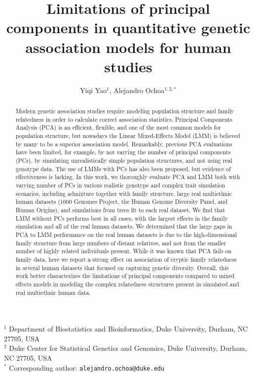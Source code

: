 \documentclass[11pt]{article}
\title{\Large \textbf{
    Limitations of principal components in quantitative genetic association models for human studies
  }}
\author{Yiqi Yao$^1$, Alejandro Ochoa$^{1,2,*}$}
\date{}
\begin{document}
\maketitle

\noindent
$^1$ Department of Biostatistics and Bioinformatics, Duke University, Durham, NC 27705, USA \\
$^2$ Duke Center for Statistical Genetics and Genomics, Duke University, Durham, NC 27705, USA \\
$^*$ Corresponding author: \texttt{alejandro.ochoa@duke.edu}

\begin{abstract}
  Modern genetic association studies require modeling population structure and family relatedness in order to calculate correct association statistics.
  Principal Components Analysis (PCA) is an efficient, flexible, and one of the most common models for population structure, but nowadays the Linear Mixed-Effects Model (LMM) is believed by many to be a superior association model.
  Remarkably, previous PCA evaluations have been limited, for example, by not varying the number of principal components (PCs), by simulating unrealistically simple population structures, and not using real genotype data.
  The use of LMMs with PCs has also been proposed, but evidence of effectiveness is lacking.
  In this work, we thoroughly evaluate PCA and LMM both with varying number of PCs in various realistic genotype and complex trait simulation scenarios, including admixture together with family structure, large real multiethnic human datasets (1000 Genomes Project, the Human Genome Diversity Panel, and Human Origins), and simulations from trees fit to each real dataset.
  We find that LMM without PCs performs best in all cases, with the largest effects in the family simulation and all of the real human datasets.
  We determined that the large gaps in PCA to LMM performance on the real human datasets is due to the high-dimensional family structure from large numbers of distant relatives, and not from the smaller number of highly related individuals present.
  While it was known that PCA fails on family data, here we report a strong effect on association of cryptic family relatedness in several human datasets that focused on capturing genetic diversity.
  Overall, this work better characterizes the limitations of principal components compared to mixed effects models in modeling the complex relatedness structures present in simulated and real multiethnic human data.

\end{abstract}
\end{document}
